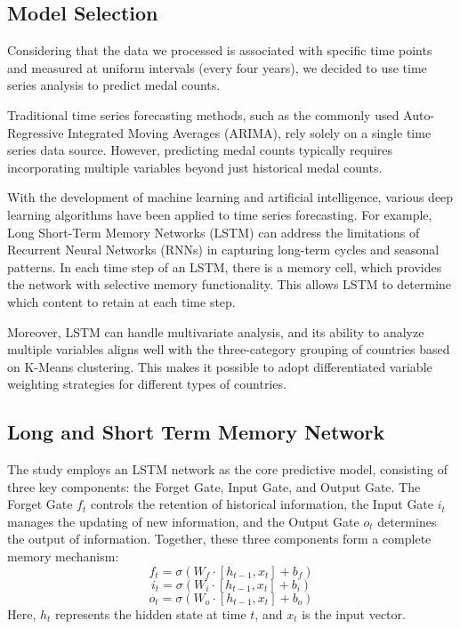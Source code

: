 \documentclass{mcmthesis}
\begin{document}
\subsection{Model Selection}
Considering that the data we processed is associated with specific time points and measured at uniform intervals (every four years), we decided to use time series analysis to predict medal counts.

Traditional time series forecasting methods, such as the commonly used Auto-Regressive Integrated Moving Averages (ARIMA), rely solely on a single time series data source. However, predicting medal counts typically requires incorporating multiple variables beyond just historical medal counts.

With the development of machine learning and artificial intelligence, various deep learning algorithms have been applied to time series forecasting. For example, Long Short-Term Memory Networks (LSTM) can address the limitations of Recurrent Neural Networks (RNNs) in capturing long-term cycles and seasonal patterns. In each time step of an LSTM, there is a memory cell, which provides the network with selective memory functionality. This allows LSTM to determine which content to retain at each time step.

Moreover, LSTM can handle multivariate analysis, and its ability to analyze multiple variables aligns well with the three-category grouping of countries based on K-Means clustering. This makes it possible to adopt differentiated variable weighting strategies for different types of countries.

\subsection{Long and Short Term Memory Network}
The study employs an LSTM network as the core predictive model, consisting of three key components: the Forget Gate, Input Gate, and Output Gate. The Forget Gate $f_t$ controls the retention of historical information, the Input Gate $i_t$ manages the updating of new information, and the Output Gate $o_t$ determines the output of information. Together, these three components form a complete memory mechanism:
\begin{equation}\label{}
    f_t=\sigma(W_f\cdot[h_{t-1},x_t]+b_f)
\end{equation}
\begin{equation}\label{}
    i_t=\sigma(W_i\cdot[h_{t-1},x_t]+b_i)
\end{equation}
\begin{equation}\label{}
    o_t=\sigma(W_o\cdot[h_{t-1},x_t]+b_o)
\end{equation}
Here, $h_t$ represents the hidden state at time $t$, and $x_t$ is the input vector.
\end{document}
